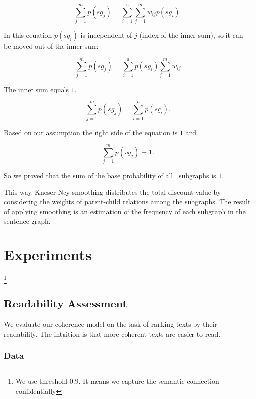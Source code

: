 \begin{equation*}
\sum_{j=1}^m p(sg_j) = \sum_{i=1}^n \sum_{j=1}^m w_{ij}p(sg_i).
\end{equation*}

\noindent
In this equation $p(sg_i)$ is independent of $j$ (index of the inner
sum), so it can be moved out of the inner sum:

\begin{equation*}
\sum_{j=1}^m p(sg_j) = \sum_{i=1}^n p(sg_i) \sum_{j=1}^m w_{ij}
\end{equation*}

\noindent
The inner sum equals $1$.

\begin{equation*}
\sum_{j=1}^m p(sg_j) = \sum_{i=1}^n p(sg_i).
\end{equation*}

\noindent
Based on our assumption the right side of the equation is $1$ and 

\begin{equation*}
\sum_{j=1}^m p(sg_j) = 1.
\end{equation*}

\noindent
So we proved that the sum of the base probability of all \knode\
subgraphs is $1$.\QEDB


This way, Kneser-Ney smoothing distributes the total discount value by
considering the weights of parent-child relations among the
subgraphs. The result of applying smoothing is an estimation of the
frequency of each subgraph in the sentence graph.



\section{Experiments}
\label{sec:experiments}

\footnote{We use threshold $0.9$. It means we capture the semantic connection confidentially}


\subsection{Readability Assessment}
\label{subsec:readability_assessment}
We evaluate our coherence model on the task of ranking texts by their
readability. The intuition is that more coherent texts are easier to
read. 


\subsubsection{Data}
